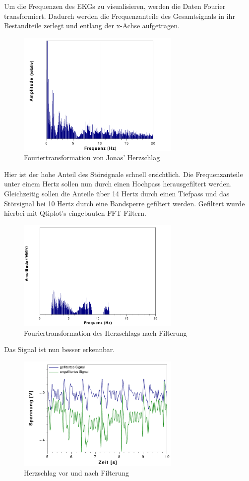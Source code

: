 Um die Frequenzen des EKGs zu visualisieren, werden die Daten Fourier transformiert.
Dadurch werden die Frequenzanteile des Gesamtsignals in ihr Bestandteile zerlegt
und entlang der x-Achse aufgetragen.
\begin{figure}[H]
	\centering
	\includegraphics[width=0.7\textwidth]{Mess/Ekg/jonas_nofft_rel.pdf}
	\caption{Fouriertransformation von Jonas' Herzschlag}
	\label{jonfftnofilter}
\end{figure}
Hier ist der hohe Anteil des Störsignale schnell ersichtlich.
Die Frequenzanteile unter einem Hertz sollen nun durch einen Hochpass herausgefiltert werden.
Gleichzeitig sollen die Anteile über 14 Hertz durch einen Tiefpass und das Störsignal bei
10 Hertz durch eine Bandsperre gefiltert werden. Gefiltert wurde hierbei mit Qtiplot's eingebauten FFT Filtern. 
\begin{figure}[H]
	\centering
	\includegraphics[width=0.7\textwidth]{Mess/Ekg/jonas_fft_rel.pdf}
	\caption{Fouriertransformation des Herzschlags nach Filterung}
	\label{jonfft}
\end{figure}
Das Signal ist nun besser erkennbar.
\begin{figure}[H]
	\centering
	\includegraphics[width=0.7\textwidth]{Mess/Ekg/jonas_filter_neu.pdf}
	\caption{Herzschlag vor und nach Filterung}
	\label{jonfilter}
\end{figure}
